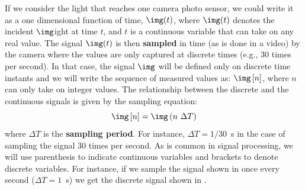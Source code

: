 
If we consider the light that reaches one camera photo sensor, we could write it as a one dimensional function of time, $\img (t)$, where $\img (t)$ denotes the incident $\img$ight at time $t$, and $t$ is a continuous variable that can take on any real value. 
The signal $\img (t)$ is then {\bf sampled} in time (as is done in a video) by the camera where the values are only captured at discrete times (e.g., 30 times per second).
In that case, the signal $\img$ will be defined only on discrete time instants and we will write the sequence of measured values as: $\img \left[ n \right]$, where $n$ can only take on integer values. The relationship between the discrete and the continuous signals is given by the sampling equation:
\begin{equation}
\img \left[n\right] = \img \left(n~\Delta T \right)
\end{equation}
where $\Delta T$ is the {\bf sampling period}. For instance, $\Delta T = 1/30$~s in the case of sampling the signal 30 times per second.
%
As is common in signal processing, we will use parenthesis to indicate continuous variables and brackets to denote discrete variables. For instance, if we sample the signal shown in  once every second ($\Delta T = 1$~s) we get the discrete signal shown in .



